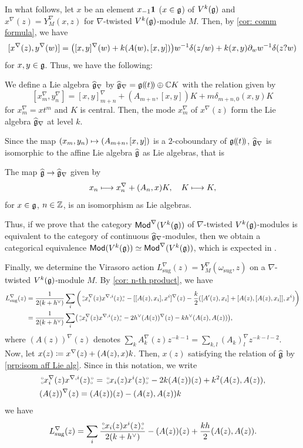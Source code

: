 \documentclass[final,reqno]{amsart}
\begin{document}
In what follows, let $x$ be an element $x_{-1}\mathbf{1}$ ($x\in\mathfrak{g}$) of $V^k(\mathfrak{g})$ and $x^\nabla(z)=Y^\nabla_M(x,z)$ for $\nabla$-twisted $V^k(\mathfrak{g})$-module $M$. Then, by \cref{cor: comm formula}, we have
\[
    [x^\nabla(z),y^\nabla(w)]=\bigl([x,y]^\nabla(w)+k(A(w),[x,y])\bigr)w^{-1}\delta(z/w)+k(x,y)\partial_ww^{-1}\delta(z?w)
\]
for $x,y\in\mathfrak{g}$. Thus, we have the following:
\begin{prp}\label{prp:deform mode alg aff va}
    We define a Lie algebra $\widehat{\mathfrak{g}}_\nabla$ by $\widehat{\mathfrak{g}}_\nabla=\mathfrak{g}(\!( t )\!)\oplus\mathbb{C} K$ with the relation given by
    \[
        [x^\nabla_m,y^\nabla_n]=[x,y]^\nabla_{m+n}+(A_{m+n},[x,y])K+m\delta_{m+n,0}(x,y)K
    \]
    for $x^\nabla_m=xt^m$ and $K$ is central. Then, the mode $x^\nabla_m$ of $x^\nabla(z)$ form the Lie algebra $\widehat{\mathfrak{g}}_\nabla$ at level $k$.
\end{prp}

Since the map $(x_m,y_n)\mapsto (A_{m+n},[x,y])$ is a $2$-coboundary of $\mathfrak{g}(\!( t )\!)$, $\widehat{\mathfrak{g}}_\nabla$ is isomorphic to the affine Lie algebra $\widehat{\mathfrak{g}}$ as Lie algebras, that is
\begin{prp}\label{prp:isom aff Lie alg}
    The map $\widehat{\mathfrak{g}}\to\widehat{\mathfrak{g}}_\nabla$ given by
    \[
        x_n\longmapsto x^\nabla_n+(A_n,x)K,
        \quad
        K\longmapsto K,
    \]
    for $x\in\mathfrak{g}$, $n\in\mathbb{Z}$, is an isomorphism as Lie algebras.
\end{prp}

Thus, if we prove that the category $\mathsf{Mod}^\nabla(V^k(\mathfrak{g}))$ of $\nabla$-twisted $V^k(\mathfrak{g})$-modules is equivalent to the category of continuous $\widehat{\mathfrak{g}}_\nabla$-modules, then we obtain a categorical equivalence $\mathsf{Mod}(V^k(\mathfrak{g}))\simeq\mathsf{Mod}^\nabla(V^k(\mathfrak{g}))$, which is expected in \cite{FL25,FL26}.

Finally, we determine the Virasoro action $L^\nabla_\mathrm{sug}(z)=Y^\nabla_M(\omega_\mathrm{sug},z)$ on a $\nabla$-twisted $V^k(\mathfrak{g})$-module $M$. By \cref{cor: n-th product}, we have
\[
    \begin{split}
    L^\nabla_\mathrm{sug}(z)
    &=\frac{1}{2(k+h^\vee)}\sum_i
    \left(
    \,\substack{\scriptscriptstyle\circ \\ \scriptscriptstyle\circ} x^\nabla_i(z)x^{\nabla,i}(z) \substack{\scriptscriptstyle\circ \\ \scriptscriptstyle\circ\,}-[[A(z),x_i],x^i]^\nabla(z)-\frac{k}{2}([A'(z),x_i]+[A(z),[A(z),x_i]],x^i)
    \right)\\
    &=\frac{1}{2(k+h^\vee)}\sum_i
    \bigl(
    \,\substack{\scriptscriptstyle\circ \\ \scriptscriptstyle\circ} x^\nabla_i(z)x^{\nabla,i}(z) \substack{\scriptscriptstyle\circ \\ \scriptscriptstyle\circ\,}-2h^\vee (A(z))^\nabla(z)-kh^\vee(A(z),A(z))
    \bigr),
    \end{split}
\]
where $(A(z))^\nabla(z)$ denotes $\sum_{k}A^\nabla_k(z)z^{-k-1}=\sum_{k,l}(A_k)^\nabla_lz^{-k-l-2}$. Now, let $x(z)\coloneqq x^\nabla(z)+(A(z),x)k$. Then, $x(z)$ satisfying the relation of $\widehat{\mathfrak{g}}$ by \cref{prp:isom aff Lie alg}. Since in this notation, we write 
\[
    \begin{split}
    &\,\substack{\scriptscriptstyle\circ \\ \scriptscriptstyle\circ} x_i^\nabla(z)x^{\nabla,i}(z) \substack{\scriptscriptstyle\circ \\ \scriptscriptstyle\circ\,}=\,\substack{\scriptscriptstyle\circ \\ \scriptscriptstyle\circ} x_i(z)x^i(z) \substack{\scriptscriptstyle\circ \\ \scriptscriptstyle\circ\,}-2k(A(z))(z)+k^2(A(z),A(z)),\\
    &(A(z))^\nabla(z)=(A(z))(z)-(A(z),A(z))k
    \end{split}
\]
we have
\[
    L^\nabla_\mathrm{sug}(z)=\sum_i\frac{\,\substack{\scriptscriptstyle\circ \\ \scriptscriptstyle\circ} x_i(z)x^i(z) \substack{\scriptscriptstyle\circ \\ \scriptscriptstyle\circ\,}}{2(k+h^\vee)}-(A(z))(z)+\frac{kh}{2}(A(z),A(z)).
\]
\end{document}
